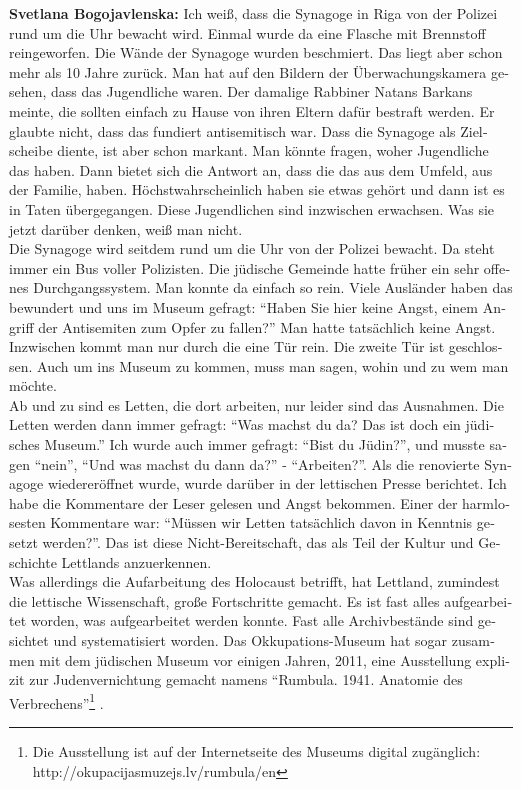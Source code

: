 \begin{otherlanguage}{ngerman}
\textbf{Svetlana Bogojavlenska:} Ich weiß, dass die Synagoge in Riga von der Polizei rund um die Uhr bewacht wird. Einmal wurde da eine Flasche mit Brennstoff reingeworfen. Die Wände der Synagoge wurden beschmiert. Das liegt aber schon mehr als 10 Jahre zurück. Man hat auf den Bildern der Überwachungskamera gesehen, dass das Jugendliche waren. Der damalige Rabbiner Natans Barkans meinte, die sollten einfach zu Hause von ihren Eltern dafür bestraft werden. Er glaubte nicht, dass das fundiert antisemitisch war. Dass die Synagoge als Zielscheibe diente, ist aber schon markant. Man könnte fragen, woher Jugendliche das haben. Dann bietet sich die Antwort an, dass die das aus dem Umfeld, aus der Familie, haben. Höchstwahrscheinlich haben sie etwas gehört und dann ist es in Taten übergegangen. Diese Jugendlichen sind inzwischen erwachsen. Was sie jetzt darüber denken, weiß man nicht.\\ 
Die Synagoge wird seitdem rund um die Uhr von der Polizei bewacht. Da steht immer ein Bus voller Polizisten. Die jüdische Gemeinde hatte früher ein sehr offenes Durchgangssystem. Man konnte da einfach so rein. Viele Ausländer haben das bewundert und uns im Museum gefragt: "`Haben Sie hier keine Angst, einem Angriff der Antisemiten zum Opfer zu fallen?"' Man hatte tatsächlich keine Angst. Inzwischen kommt man nur durch die eine Tür rein. Die zweite Tür ist geschlossen. Auch um ins Museum zu kommen, muss man sagen, wohin und zu wem man möchte.\\
Ab und zu sind es Letten, die dort arbeiten, nur leider sind das Ausnahmen. Die Letten werden dann immer gefragt: "`Was machst du da? Das ist doch ein jüdisches Museum."' Ich wurde auch immer gefragt: "`Bist du Jüdin?"', und musste sagen "`nein"', "`Und was machst du dann da?"' - "`Arbeiten?"'. Als die renovierte Synagoge wiedereröffnet wurde, wurde darüber in der lettischen Presse berichtet. Ich habe die Kommentare der Leser gelesen und Angst bekommen. Einer der harmlosesten Kommentare war: "`Müssen wir Letten tatsächlich davon in Kenntnis gesetzt werden?"'. Das ist diese Nicht-Bereitschaft, das als Teil der Kultur und Geschichte Lettlands anzuerkennen.\\
Was allerdings die Aufarbeitung des Holocaust betrifft, hat Lettland, zumindest die lettische Wissenschaft, große Fortschritte gemacht. Es ist fast alles aufgearbeitet worden, was aufgearbeitet werden konnte. Fast alle Archivbestände sind gesichtet und systematisiert worden. Das Okkupations-Museum hat sogar zusammen mit dem jüdischen Museum vor einigen Jahren, 2011, eine Ausstellung explizit zur Judenvernichtung gemacht namens "`Rumbula. 1941. Anatomie des Verbrechens"'\footnote{Die Ausstellung ist auf der Internetseite des Museums digital zugänglich: http://okupacijasmuzejs.lv/rumbula/en} .


\end{otherlanguage}
